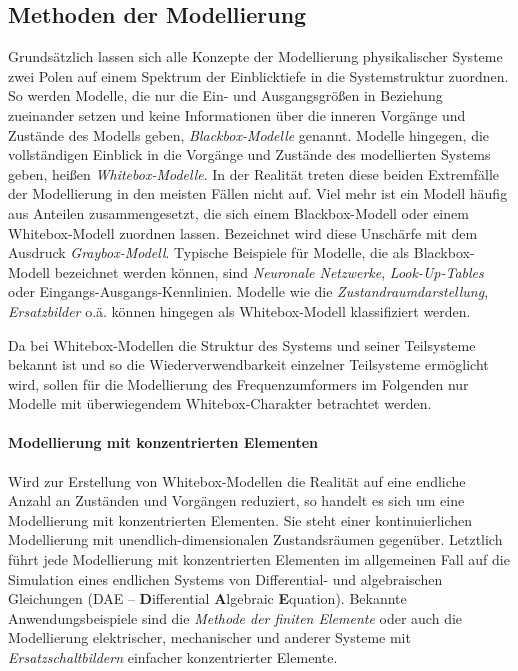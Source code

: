 \subsection{Methoden der Modellierung}
\label{subsec:ArtenModellierung}
Grundsätzlich lassen sich alle Konzepte der Modellierung physikalischer Systeme zwei Polen auf einem Spektrum der Einblicktiefe in die Systemstruktur zuordnen. So werden Modelle, die nur die Ein- und Ausgangsgrößen in Beziehung zueinander setzen und keine Informationen über die inneren Vorgänge und Zustände des Modells geben, \emph{Blackbox-Modelle} genannt. Modelle hingegen, die vollständigen Einblick in die Vorgänge und Zustände des modellierten Systems geben, heißen \emph{Whitebox-Modelle}. In der Realität treten diese beiden Extremfälle der Modellierung in den meisten Fällen nicht auf. Viel mehr ist ein Modell häufig aus Anteilen zusammengesetzt, die sich einem Blackbox-Modell oder einem Whitebox-Modell zuordnen lassen. Bezeichnet wird diese Unschärfe mit dem Ausdruck \emph{Graybox-Modell}. Typische Beispiele für Modelle, die als Blackbox-Modell bezeichnet werden können, sind \emph{Neuronale Netzwerke}, \emph{Look-Up-Tables} oder Eingangs-Ausgangs-Kennlinien. Modelle wie die \emph{Zustandraumdarstellung}, \emph{Ersatzbilder} o.ä. können hingegen als Whitebox-Modell klassifiziert werden. 

Da bei Whitebox-Modellen die Struktur des Systems und seiner Teilsysteme bekannt ist und so die Wiederverwendbarkeit einzelner Teilsysteme ermöglicht wird, sollen für die Modellierung des Frequenzumformers im Folgenden nur Modelle mit überwiegendem Whitebox-Charakter betrachtet werden.

\paragraph{Modellierung mit konzentrierten Elementen} Wird zur Erstellung von Whitebox-Modellen die Realität auf eine endliche Anzahl an Zuständen und Vorgängen reduziert, so handelt es sich um eine Modellierung mit konzentrierten Elementen. Sie steht einer kontinuierlichen Modellierung mit unendlich-dimensionalen Zustandsräumen gegenüber. Letztlich führt jede Modellierung mit konzentrierten Elementen im allgemeinen Fall auf die Simulation eines endlichen Systems von Differential- und algebraischen Gleichungen (DAE -- \textbf{D}ifferential \textbf{A}lgebraic \textbf{E}quation). Bekannte Anwendungsbeispiele sind die \emph{Methode der finiten Elemente} oder auch die Modellierung elektrischer, mechanischer und anderer Systeme mit \emph{Ersatzschaltbildern} einfacher konzentrierter Elemente. 

